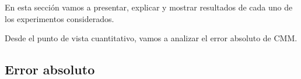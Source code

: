 En esta sección vamos a presentar, explicar y mostrar resultados de cada uno de los experimentos considerados.

Desde el punto de vista cuantitativo, vamos a analizar el error absoluto de CMM.

\subsection{Error absoluto}


\newpage

